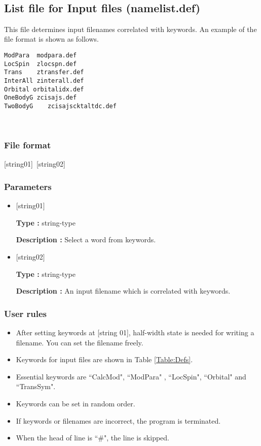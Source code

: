 \newpage
~\subsection{List file for Input files (namelist.def)}
\label{Subsec:InputFileList}
This file determines input filenames correlated with keywords. An example of the file format is shown as follows.\\
\begin{minipage}{10cm}
\begin{screen}
\begin{verbatim}
ModPara  modpara.def
LocSpin  zlocspn.def
Trans    ztransfer.def
InterAll zinterall.def
Orbital orbitalidx.def
OneBodyG zcisajs.def
TwoBodyG	zcisajscktaltdc.def
\end{verbatim}
\end{screen}
\end{minipage}
\\
\subsubsection{File format}
[string01]~[string02]
\subsubsection{Parameters}
 \begin{itemize}
   \item  $[$string01$]$
   
   {\bf Type :} string-type
   
   {\bf Description :} Select a word from keywords.
   
   \item  $[$string02$]$
   
    {\bf Type :} string-type 

   {\bf Description :} An input filename which is correlated with keywords.
 \end{itemize}
\subsubsection{User rules}
\begin{itemize}
\item  After setting keywords at [string 01], half-width state is needed for writing a filename. You can set the filename freely.
\item Keywords for input files are shown in Table \ref{Table:Defs}.
\item Essential keywords are ``CalcMod", ``ModPara" , ``LocSpin", ``Orbital" and ``TransSym".
\item Keywords can be set in random order.
\item If keywords or filenames are incorrect, the program is terminated. 
\item When the head of line is ``$\#$", the line is skipped.
\end{itemize}


